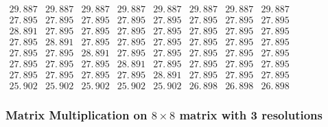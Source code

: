 \documentclass{article}
\begin{document}
$\allowbreak 
\begin{array}{cccccccc}
29.\,\allowbreak 887 & 29.\,\allowbreak 887 & 29.\,\allowbreak 887 & 
29.\,\allowbreak 887 & 29.\,\allowbreak 887 & 29.\,\allowbreak 887 & 
29.\,\allowbreak 887 & 29.\,\allowbreak 887 \\ 
27.\,\allowbreak 895 & 27.\,\allowbreak 895 & 27.\,\allowbreak 895 & 
27.\,\allowbreak 895 & 27.\,\allowbreak 895 & 27.\,\allowbreak 895 & 
27.\,\allowbreak 895 & 27.\,\allowbreak 895 \\ 
28.\,\allowbreak 891 & 27.\,\allowbreak 895 & 27.\,\allowbreak 895 & 
27.\,\allowbreak 895 & 27.\,\allowbreak 895 & 27.\,\allowbreak 895 & 
27.\,\allowbreak 895 & 27.\,\allowbreak 895 \\ 
27.\,\allowbreak 895 & 28.\,\allowbreak 891 & 27.\,\allowbreak 895 & 
27.\,\allowbreak 895 & 27.\,\allowbreak 895 & 27.\,\allowbreak 895 & 
27.\,\allowbreak 895 & 27.\,\allowbreak 895 \\ 
27.\,\allowbreak 895 & 27.\,\allowbreak 895 & 28.\,\allowbreak 891 & 
27.\,\allowbreak 895 & 27.\,\allowbreak 895 & 27.\,\allowbreak 895 & 
27.\,\allowbreak 895 & 27.\,\allowbreak 895 \\ 
27.\,\allowbreak 895 & 27.\,\allowbreak 895 & 27.\,\allowbreak 895 & 
28.\,\allowbreak 891 & 27.\,\allowbreak 895 & 27.\,\allowbreak 895 & 
27.\,\allowbreak 895 & 27.\,\allowbreak 895 \\ 
27.\,\allowbreak 895 & 27.\,\allowbreak 895 & 27.\,\allowbreak 895 & 
27.\,\allowbreak 895 & 28.\,\allowbreak 891 & 27.\,\allowbreak 895 & 
27.\,\allowbreak 895 & 27.\,\allowbreak 895 \\ 
25.\,\allowbreak 902 & 25.\,\allowbreak 902 & 25.\,\allowbreak 902 & 
25.\,\allowbreak 902 & 25.\,\allowbreak 902 & 26.\,\allowbreak 898 & 
26.\,\allowbreak 898 & 26.\,\allowbreak 898
\end{array}
\allowbreak $

\subsubsection{Matrix Multiplication on $8\times 8$ matrix with 3 resolutions}
\end{document}
